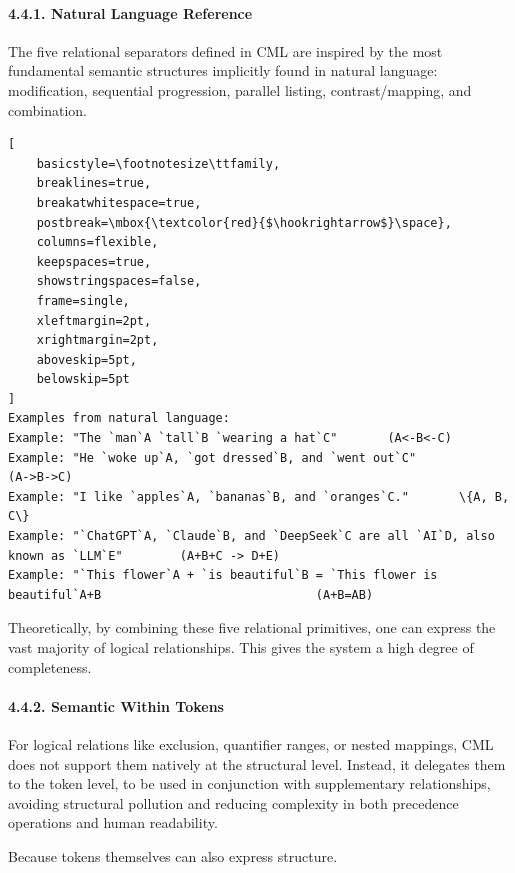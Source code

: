\documentclass[conference]{IEEEtran}
\begin{document}
\paragraph{4.4.1. Natural Language
Reference}\label{441-natural-language-reference}

The five relational separators defined in CML are inspired by the most
fundamental semantic structures implicitly found in natural language:
modification, sequential progression, parallel listing,
contrast/mapping, and combination.

\begin{lstlisting}[
    basicstyle=\footnotesize\ttfamily,
    breaklines=true,
    breakatwhitespace=true,
    postbreak=\mbox{\textcolor{red}{$\hookrightarrow$}\space},
    columns=flexible,
    keepspaces=true,
    showstringspaces=false,
    frame=single,
    xleftmargin=2pt,
    xrightmargin=2pt,
    aboveskip=5pt,
    belowskip=5pt
]
Examples from natural language:
Example: "The `man`A `tall`B `wearing a hat`C"       (A<-B<-C)
Example: "He `woke up`A, `got dressed`B, and `went out`C"            (A->B->C)
Example: "I like `apples`A, `bananas`B, and `oranges`C."       \{A, B, C\}
Example: "`ChatGPT`A, `Claude`B, and `DeepSeek`C are all `AI`D, also known as `LLM`E"        (A+B+C -> D+E)
Example: "`This flower`A + `is beautiful`B = `This flower is beautiful`A+B                              (A+B=AB)
\end{lstlisting}


Theoretically, by combining these five relational primitives, one can
express the vast majority of logical relationships. This gives the
system a high degree of completeness.

\paragraph{4.4.2. Semantic Within
Tokens}\label{442-semantic-within-tokens}

For logical relations like exclusion, quantifier ranges, or nested
mappings, CML does not support them natively at the structural level.
Instead, it delegates them to the token level, to be used in conjunction
with supplementary relationships, avoiding structural pollution and
reducing complexity in both precedence operations and human readability.

Because tokens themselves can also express structure.
\end{document}
